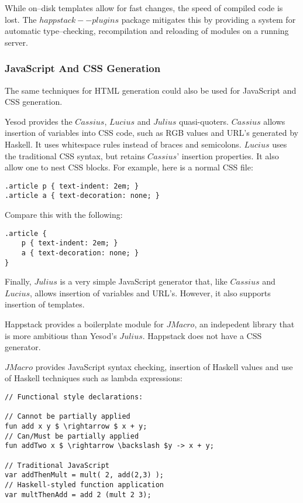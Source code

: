 While on--disk templates allow for fast changes, the speed of compiled code is lost.
The $ happstack--plugins $ package mitigates this by providing a system for automatic type--checking, recompilation and reloading of modules on a running server.

\subsubsection{JavaScript And CSS Generation}
The same techniques for HTML generation could also be used for JavaScript and CSS generation.

Yesod provides the $ Cassius $, $ Lucius $ and $ Julius $ quasi-quoters.
$ Cassius $ allows insertion of variables into CSS code, such as RGB values and URL's generated by Haskell. It uses whitespace rules instead of braces and semicolons.
$ Lucius $ uses the traditional CSS syntax, but retains $ Cassius $' insertion properties.
It also allow one to nest CSS blocks.
For example, here is a normal CSS file:

\begin{lstlisting}
.article p { text-indent: 2em; }
.article a { text-decoration: none; }
\end{lstlisting}

Compare this with the following:

\begin{lstlisting}
.article {
    p { text-indent: 2em; }
    a { text-decoration: none; }
}
\end{lstlisting}

Finally, $ Julius $ is a very simple JavaScript generator that, like $ Cassius $ and $ Lucius $, allows insertion of variables and URL's.
However, it also supports insertion of templates.

Happstack provides a boilerplate module for $ JMacro $, an indepedent library that is more ambitious than Yesod's $ Julius $.
Happstack does not have a CSS generator.

$ JMacro $ provides JavaScript syntax checking, insertion of Haskell values and use of Haskell techniques such as lambda expressions:

\begin{lstlisting}[mathescape=true]
// Functional style declarations:

// Cannot be partially applied
fun add x y $ \rightarrow $ x + y;
// Can/Must be partially applied
fun addTwo x $ \rightarrow \backslash $y -> x + y;  

// Traditional JavaScript
var addThenMult = mult( 2, add(2,3) );
// Haskell-styled function application
var multThenAdd = add 2 (mult 2 3);
\end{lstlisting}

